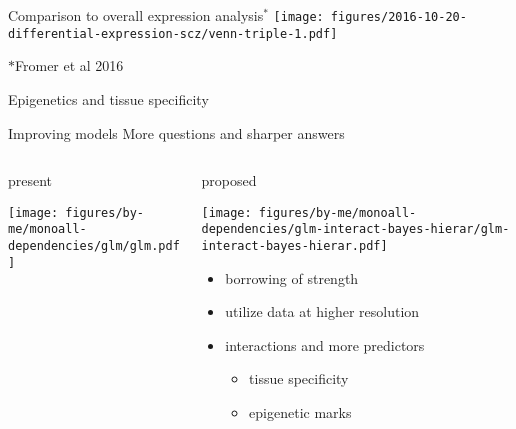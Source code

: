 \documentclass{beamer}
\newcommand{\platefigscale}[0]{0.7}
\begin{document}






\begin{frame}{Comparison to overall expression analysis\(^\ast\)}
\texttt{[image: figures/2016-10-20-differential-expression-scz/venn-triple-1.pdf]}

{\tiny\(\ast\)Fromer et al 2016}
\end{frame}

\begin{frame}{Epigenetics and tissue specificity}

\end{frame}

\begin{frame}{Improving models}
{More questions and sharper answers}
\begin{columns}[t]
\begin{column}{0.4\textwidth}
present

\texttt{[image: figures/by-me/monoall-dependencies/glm/glm.pdf]}
\end{column}

\begin{column}{0.6\textwidth}
proposed

\texttt{[image: figures/by-me/monoall-dependencies/glm-interact-bayes-hierar/glm-interact-bayes-hierar.pdf]}
\begin{itemize}
\item borrowing of strength
\item utilize data at higher resolution
\item interactions and more predictors
\begin{itemize}
\item tissue specificity
\item epigenetic marks 
\end{itemize}
\end{itemize}
\end{column}
\end{columns}

\end{frame}



\end{document}
